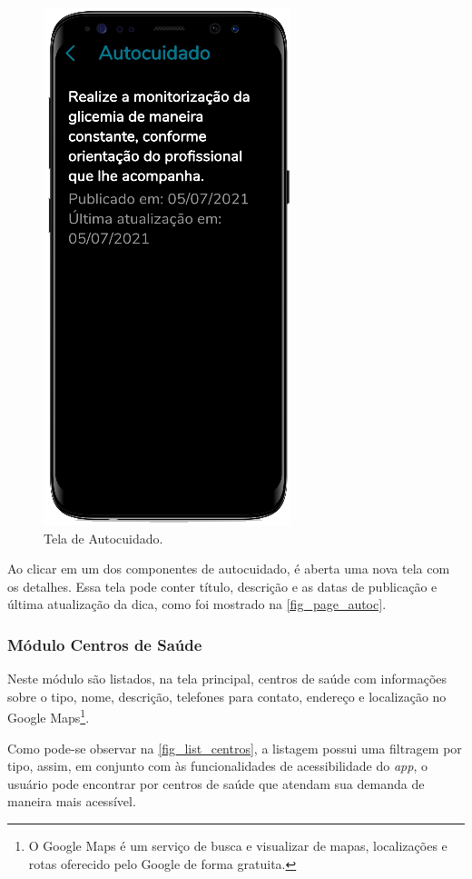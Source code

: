 \begin{figure}[htb]
\begin{minipage}{0.45\textwidth}
        \caption{Tela de Autocuidado.}\label{fig_page_autoc}
        \includegraphics[scale=0.72]{Imagens/desenvolvimento/app/page_autoc.png}
    \end{minipage}
\end{figure}

Ao clicar em um dos componentes de autocuidado, é aberta uma nova tela com os detalhes. Essa tela pode
conter título, descrição e as datas de publicação e última atualização da dica, como foi mostrado na
\autoref{fig_page_autoc}.

\subsubsection{Módulo Centros de Saúde}

Neste módulo são listados, na tela principal, centros de saúde com informações sobre o tipo, nome, descrição,
telefones para contato, endereço e localização no Google Maps\footnote{O Google Maps é um serviço de busca e
    visualizar de mapas, localizações e rotas oferecido pelo Google de forma gratuita.}.

Como pode-se observar na \autoref{fig_list_centros}, a listagem possui uma filtragem por tipo, assim,
em conjunto com às funcionalidades de acessibilidade do \emph{app}, o usuário pode encontrar por
centros de saúde que atendam sua demanda de maneira mais acessível.

